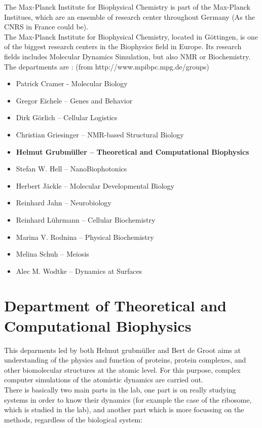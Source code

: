 \documentclass[10pt,twoside,a4paper]{report}
\begin{document}
The Max-Planck Institute for Biophysical Chemistry is part of the Max-Planck Institues, which are an ensemble of research center throughout Germany (As the CNRS in France could be).\\

The Max-Planck Institute for Biophysical Chemistry, located in Göttingen, is one of the biggest research centers in the Biophysics field in Europe. Its research fields includes Molecular Dynamics Simulation, but also NMR or Biochemistry.\\
The departments are : (from http://www.mpibpc.mpg.de/groups)
\begin{itemize}
\item Patrick Cramer - Molecular Biology
\item Gregor Eichele – Genes and Behavior
\item Dirk Görlich – Cellular Logistics
\item Christian Griesinger – NMR-based Structural  Biology
\item \textbf{Helmut Grubmüller – Theoretical and Computational Biophysics}
\item Stefan W. Hell – NanoBiophotonics
\item Herbert Jäckle – Molecular Developmental Biology
\item Reinhard Jahn – Neurobiology
\item Reinhard Lührmann – Cellular Biochemistry
\item Marina V. Rodnina – Physical Biochemistry
\item Melina Schuh – Meiosis 
\item Alec M. Wodtke – Dynamics at Surfaces
\end{itemize}

\section*{Department of Theoretical and Computational Biophysics}

This deparments led by both Helmut grubmüller and Bert de Groot aims at understanding of the physics and function of proteins, protein complexes, and other biomolecular structures at the atomic level. For this purpose, complex computer simulations of the atomistic dynamics are carried out.\\

There is basically two main parts in the lab, one part is on really studying systems in order to know their dynamics (for example the case of the ribosome, which is studied in the lab), and another part which is more focussing on the methods, regardless of the biological system:
\end{document}

